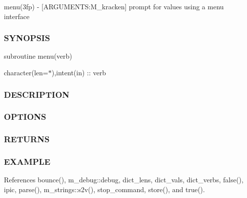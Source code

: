menu(3fp) -\/ \mbox{[}A\+R\+G\+U\+M\+E\+N\+TS\+:M\+\_\+kracken\mbox{]} prompt for values using a menu interface \subsubsection*{S\+Y\+N\+O\+P\+S\+IS}

subroutine menu(verb)

character(len=$\ast$),intent(in) \+:\+: verb \subsubsection*{D\+E\+S\+C\+R\+I\+P\+T\+I\+ON}

\subsubsection*{O\+P\+T\+I\+O\+NS}

\subsubsection*{R\+E\+T\+U\+R\+NS}

\subsubsection*{E\+X\+A\+M\+P\+LE}

References bounce(), m\+\_\+debug\+::debug, dict\+\_\+lens, dict\+\_\+vals, dict\+\_\+verbs, false(), ipic, parse(), m\+\_\+strings\+::s2v(), stop\+\_\+command, store(), and true().

